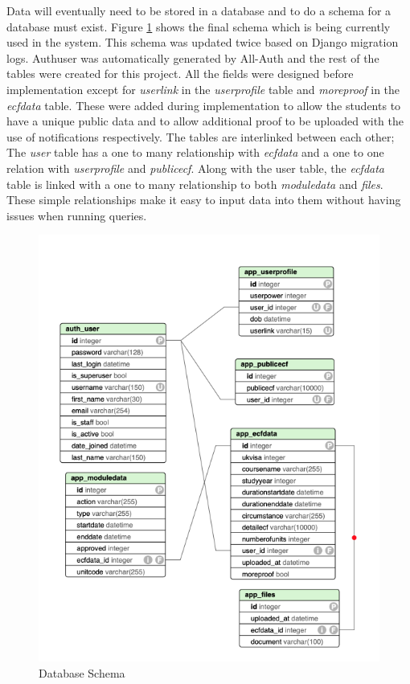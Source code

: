 \documentclass[../main.tex]{subfiles}
\begin{document}
\raggedright
Data will eventually need to be stored in a database and to do a schema for a database must exist. Figure \ref{fig:dbschema} shows the final schema which is being currently used in the system. This schema was updated twice based on Django migration logs. Authuser was automatically generated by All-Auth\cite{allauth} and the rest of the tables were created for this project. All the fields were designed before implementation except for \textit{userlink} in the \textit{userprofile} table and \textit{moreproof} in the \textit{ecfdata} table. These were added during implementation to allow the students to have a unique public data and to allow additional proof to be uploaded with the use of notifications respectively. The tables are interlinked between each other; The \textit{user} table has a one to many relationship with \textit{ecfdata} and a one to one relation with \textit{userprofile} and \textit{publicecf}. Along with the user table, the \textit{ecfdata} table is linked with a one to many relationship to both \textit{moduledata} and \textit{files}. These simple relationships make it easy to input data into them without having issues when running queries. 

\begin{figure}[H]
        \begin{center}
        \includegraphics[scale=1.2]
        {images/db.png}
        \caption{\label{fig:dbschema} Database Schema}
        \end{center}
      \end{figure}
  
  
\end{document}

